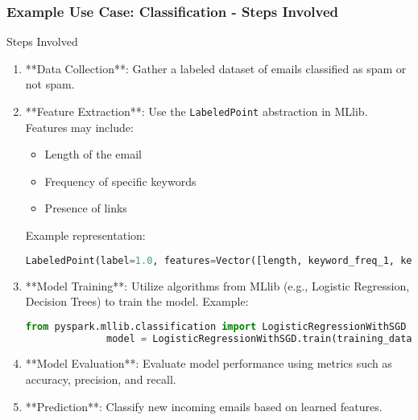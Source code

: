 \documentclass[aspectratio=169]{beamer}
\begin{document}
\begin{frame}[fragile]
    \frametitle{Example Use Case: Classification - Steps Involved}
    \begin{block}{Steps Involved}
        \begin{enumerate}
            \item **Data Collection**: Gather a labeled dataset of emails classified as spam or not spam.
            \item **Feature Extraction**: Use the \texttt{LabeledPoint} abstraction in MLlib. Features may include:
              \begin{itemize}
                  \item Length of the email
                  \item Frequency of specific keywords
                  \item Presence of links
              \end{itemize}
              Example representation:
              \begin{lstlisting}[language=Python]
              LabeledPoint(label=1.0, features=Vector([length, keyword_freq_1, keyword_freq_2, ..., link_presence]))
              \end{lstlisting}
            \item **Model Training**: Utilize algorithms from MLlib (e.g., Logistic Regression, Decision Trees) to train the model.
              Example:
              \begin{lstlisting}[language=Python]
              from pyspark.mllib.classification import LogisticRegressionWithSGD
              model = LogisticRegressionWithSGD.train(training_data)
              \end{lstlisting}
            \item **Model Evaluation**: Evaluate model performance using metrics such as accuracy, precision, and recall.
            \item **Prediction**: Classify new incoming emails based on learned features.
        \end{enumerate}
    \end{block}
\end{frame}
\end{document}
